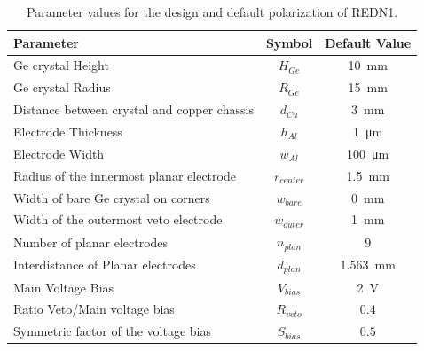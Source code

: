 \begin{table}[]
\centering
\begin{tabular}{l c S}
Parameter                                   & Symbol        & {Default Value} \\ \hline \hline
Ge crystal Height                           & $H_{Ge}$      & \SI{10}{\mm}  \\
Ge crystal Radius                           & $R_{Ge}$      & \SI{15}{\mm}    \\
Distance between crystal and copper chassis & $d_{Cu}$      & \SI{3}{\mm}     \\
Electrode Thickness                         & $h_{Al}$      & \SI{1}{\micro\meter}   \\
Electrode Width                             & $w_{Al}$      & \SI{100}{\micro\meter}  \\
Radius of the innermost planar electrode    & $r_{center}$   & \SI{1.5}{\mm}   \\
Width of bare Ge crystal on corners      & $w_{bare}$    & \SI{0}{\mm}  \\
Width of the outermost veto electrode    & $w_{outer}$    & \SI{1}{\mm}  \\
Number of planar electrodes                 & $n_{plan}$  & {$9$}             \\
Interdistance of Planar electrodes          & $d_{plan}$  & \SI{1.563}{\mm}  \\
Main Voltage Bias                           & $V_{bias}$    & \SI{2}{\volt}      \\
Ratio Veto/Main voltage bias                & $R_{veto}$    & {$0.4$}         \\
Symmetric factor of the voltage bias        & $S_{bias}$    & {$0.5$}         
\end{tabular}
\caption{Parameter values for the design and default polarization of REDN1.}
\label{tab:redn1-default-parameters}
\end{table}

